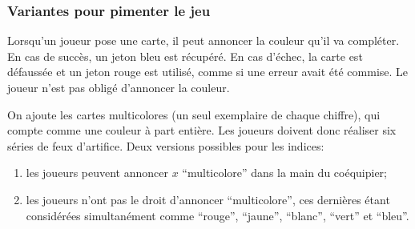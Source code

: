 \documentclass[11pt]{beamer}
\begin{document}
	\begin{frame}
		\frametitle{Variantes pour pimenter le jeu}
		
		
		
		Lorsqu'un joueur pose une carte, il \alert{peut annoncer la couleur} qu'il va compléter.
		En cas de succès, un jeton bleu est récupéré.
		En cas d'échec, la carte est défaussée et un jeton rouge est utilisé, comme si une erreur avait été commise.
		Le joueur n'est pas obligé d'annoncer la couleur.
		
		
		\vspace*{2ex}
		
		
		
		On ajoute les \alert{cartes multicolores} (un seul exemplaire de chaque chiffre), qui compte comme une couleur à part entière.
		Les joueurs doivent donc réaliser six séries de feux d'artifice.
		Deux versions possibles pour les indices:
		\begin{enumerate}
			\item les joueurs peuvent annoncer $x$  \enquote{multicolore} dans la main du coéquipier;
			\item les joueurs n'ont pas le droit d'annoncer \enquote{multicolore}, ces dernières étant considérées simultanément comme \enquote{rouge}, \enquote{jaune}, \enquote{blanc}, \enquote{vert} et \enquote{bleu}.
		\end{enumerate}
	\end{frame}

%
\end{document}
